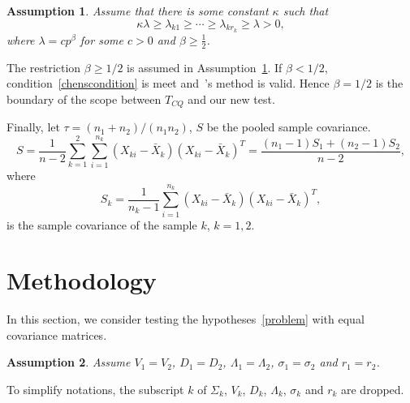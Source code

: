 \documentclass[review]{elsarticle}
\theoremstyle{plain}
\newtheorem{assumption}{\quad\quad Assumption}
\theoremstyle{definition}
\theoremstyle{remark}
\begin{document}
\begin{assumption}\label{orderOfBeta}
    Assume that there is some constant $\kappa$ such that
    \begin{equation*}
    \kappa \lambda\geq \lambda_{k1}\geq \cdots \geq\lambda_{kr_k}\geq \lambda>0,
\end{equation*}
    where $\lambda=cp^\beta$ for some $c>0$ and $\beta\geq \frac{1}{2}$.
\end{assumption}


The restriction $\beta\geq 1/2$ is assumed in Assumption~\ref{orderOfBeta}. If $\beta< 1/2$, condition~\eqref{chenscondition} is meet and~\cite{Chen2010A}'s  method is valid. 
 Hence $\beta=1/2$ is the boundary of the scope between $T_{CQ}$ and our new test.


Finally, let $\tau={(n_1+n_2)}/{(n_1n_2)}$, $S$ be the pooled sample covariance.
\begin{equation}
S=\frac{1}{n-2}\sum_{k=1}^2\sum_{i=1}^{n_k} (X_{ki}-\bar{X}_k) {(X_{ki}-\bar{X}_k)}^T
    =\frac{(n_1-1)S_1+(n_2-1)S_2}{n-2},
\end{equation}
where
\begin{equation}
S_k=\frac{1}{n_k -1}\sum_{i=1}^{n_k} (X_{ki}-\bar{X}_k) {(X_{ki}-\bar{X}_k)}^T,
\end{equation}
is the sample covariance  of the sample $k$, $k=1,2$.


\section{Methodology}

In this section, we consider testing the hypotheses~\eqref{problem} with equal covariance matrices.
\begin{assumption}\label{theModel2}
Assume $V_1=V_2$, $D_1=D_2$, $\Lambda_1=\Lambda_2$, $\sigma_1=\sigma_2$ and $r_1=r_2$.
\end{assumption}

To simplify notations, the subscript $k$ of $\Sigma_k$, $V_k$, $D_k$, $\Lambda_k$, $\sigma_k$ and $r_k$ are dropped.
\end{document}
